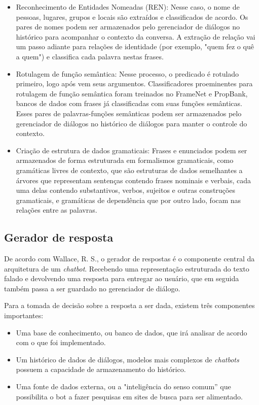 \documentclass[
	12pt,				%
	oneside,
	a4paper,			%
	english,			%
	french,				%
	spanish,			%
	brazil				%
	]{abntex2}
\begin{document}
\begin{itemize}
	\item Reconhecimento de Entidades Nomeadas (REN): Nesse caso, o nome de pessoas, lugares, grupos e locais são extraídos e classificados de acordo. Os pares de nomes podem ser armazenados pelo gerenciador de diálogos no histórico para acompanhar o contexto da conversa. A extração de relação vai um passo adiante para relações de identidade (por exemplo, "quem fez o quê a quem") e classifica cada palavra nestas frases.
	\item Rotulagem de função semântica: Nesse processo, o predicado é rotulado primeiro, logo após vem seus argumentos. Classificadores proeminentes para rotulagem de função semântica foram treinados no FrameNet e PropBank, bancos de dados com frases já classificadas com suas funções semânticas. Esses pares de palavras-funções semânticas podem ser armazenados pelo gerenciador de diálogos no histórico de diálogos para manter o controle do contexto.
	\item Criação de estrutura de dados gramaticais: Frases e enunciados podem ser armazenados de forma estruturada em formalismos gramaticais, como gramáticas livres de contexto, que são estruturas de dados semelhantes a árvores que representam sentenças contendo frases nominais e verbais, cada uma delas contendo substantivos, verbos, sujeitos e outras construções gramaticais, e gramáticas de dependência que por outro lado, focam nas relações entre as palavras.
\end{itemize}

\subsection{Gerador de resposta}
De acordo com Wallace, R. S., o gerador de respostas é o componente central da arquitetura de um \emph{chatbot}. Recebendo uma representação estruturada do texto falado e devolvendo uma resposta para entregar ao usuário, que em seguida também passa a ser guardado no gerenciador de diálogo.

Para a tomada de decisão sobre a resposta a ser dada, existem três componentes importantes:
\begin{itemize}
	\item Uma base de conhecimento, ou banco de dados, que irá analisar de acordo com o que foi implementado.
	\item Um histórico de dados de diálogos, modelos mais complexos de \emph{chatbots} possuem a capacidade de armazenamento do histórico.
	\item Uma fonte de dados externa, ou a "inteligência do senso comum” que possibilita o bot a fazer pesquisas em sites de busca para ser alimentado.
\end{itemize}
\end{document}
